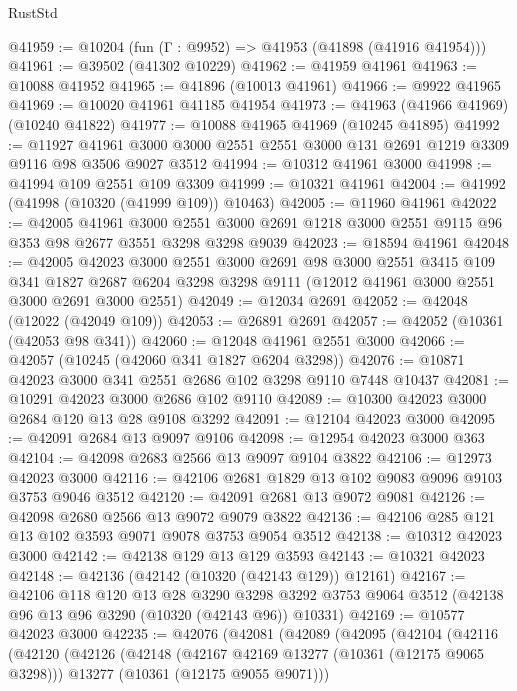 \begin{lexlean}{RustStd}
\begin{coremodule}
@41959 := @10204 (fun (Γ : @9952) => @41953 (@41898 (@41916 @41954)))
@41961 := @39502 (@41302 @10229)
@41962 := @41959 @41961
@41963 := @10088 @41952
@41965 := @41896 (@10013 @41961)
@41966 := @9922 @41965
@41969 := @10020 @41961 @41185 @41954
@41973 := @41963 (@41966 @41969) (@10240 @41822)
@41977 := @10088 @41965 @41969 (@10245 @41895)
@41992 := @11927
    @41961
    @3000
    @3000
    @2551
    @2551
    @3000
    @131
    @2691
    @1219
    @3309
    @9116
    @98
    @3506
    @9027
    @3512
@41994 := @10312 @41961 @3000
@41998 := @41994 @109 @2551 @109 @3309
@41999 := @10321 @41961
@42004 := @41992 (@41998 (@10320 (@41999 @109)) @10463)
@42005 := @11960 @41961
@42022 := @42005
    @41961
    @3000
    @2551
    @3000
    @2691
    @1218
    @3000
    @2551
    @9115
    @96
    @353
    @98
    @2677
    @3551
    @3298
    @3298
    @9039
@42023 := @18594 @41961
@42048 := @42005
    @42023
    @3000
    @2551
    @3000
    @2691
    @98
    @3000
    @2551
    @3415
    @109
    @341
    @1827
    @2687
    @6204
    @3298
    @3298
    @9111
    (@12012 @41961 @3000 @2551 @3000 @2691 @3000 @2551)
@42049 := @12034 @2691
@42052 := @42048 (@12022 (@42049 @109))
@42053 := @26891 @2691
@42057 := @42052 (@10361 (@42053 @98 @341))
@42060 := @12048 @41961 @2551 @3000
@42066 := @42057 (@10245 (@42060 @341 @1827 @6204 @3298))
@42076 := @10871 @42023 @3000 @341 @2551 @2686 @102 @3298 @9110 @7448 @10437
@42081 := @10291 @42023 @3000 @2686 @102 @9110
@42089 := @10300 @42023 @3000 @2684 @120 @13 @28 @9108 @3292
@42091 := @12104 @42023 @3000
@42095 := @42091 @2684 @13 @9097 @9106
@42098 := @12954 @42023 @3000 @363
@42104 := @42098 @2683 @2566 @13 @9097 @9104 @3822
@42106 := @12973 @42023 @3000
@42116 := @42106 @2681 @1829 @13 @102 @9083 @9096 @9103 @3753 @9046 @3512
@42120 := @42091 @2681 @13 @9072 @9081
@42126 := @42098 @2680 @2566 @13 @9072 @9079 @3822
@42136 := @42106 @285 @121 @13 @102 @3593 @9071 @9078 @3753 @9054 @3512
@42138 := @10312 @42023 @3000
@42142 := @42138 @129 @13 @129 @3593
@42143 := @10321 @42023
@42148 := @42136 (@42142 (@10320 (@42143 @129)) @12161)
@42167 := @42106
    @118
    @120
    @13
    @28
    @3290
    @3298
    @3292
    @3753
    @9064
    @3512
    (@42138 @96 @13 @96 @3290 (@10320 (@42143 @96)) @10331)
@42169 := @10577 @42023 @3000
@42235 := @42076
    (@42081
      (@42089
        (@42095
          (@42104
            (@42116
              (@42120
                (@42126
                  (@42148
                    (@42167 @42169 @13277 (@10361 (@12175 @9065 @3298)))
                    @13277
                    (@10361 (@12175 @9055 @9071)))

\end{coremodule}
\end{lexlean}
